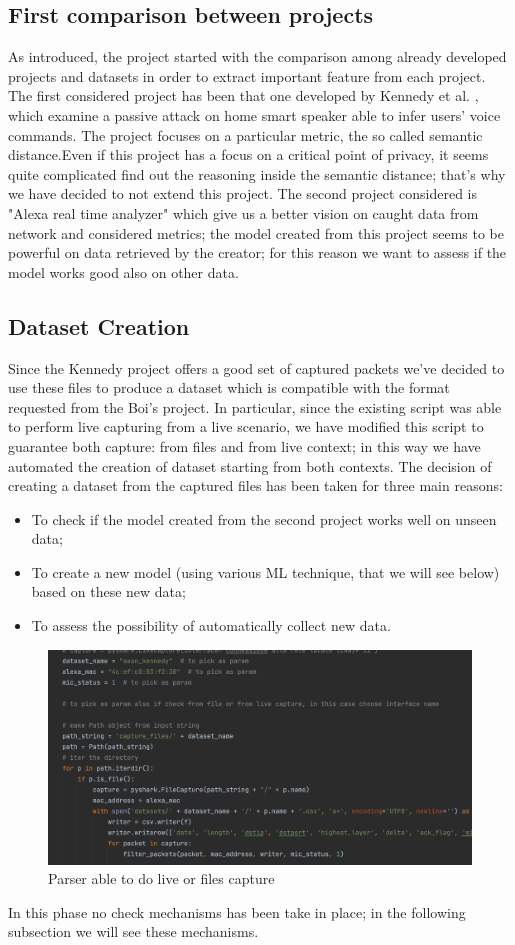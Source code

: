 \documentclass[sigconf]{acmart}
\begin{document}
\subsection{First comparison between projects}
As introduced, the project started with the comparison among already developed projects and datasets in order to extract important feature from each project. The first considered project has been that one developed by Kennedy et al. \cite{Kennedy}, which examine a passive attack on home smart speaker able to infer users' voice commands. The project focuses on a particular metric, the so called semantic distance.Even if this project has a focus on a critical point of privacy, it seems  quite complicated find out the reasoning inside the semantic distance; that's why we have decided to not extend this project. The second project considered is "Alexa real time analyzer" which give us a better vision on caught data from network and considered metrics; the model created from this project seems to be powerful on data retrieved by the creator; for this reason we want to assess if the model works good also on other data.
\subsection{Dataset Creation}
Since the Kennedy project offers a good set of captured packets we've decided to use these files to produce a dataset which is compatible with the format requested from the Boi's project. In particular, since the existing script was able to perform live capturing from a live scenario, we have modified this script to guarantee both capture: from files and from live context; in this way we have automated the creation of dataset starting from both contexts.
The decision of creating a dataset from the captured files has been taken for three main reasons:
\begin{itemize}
\item To check if the model created from the second project works well on unseen data;
\item To create a new model (using various ML technique, that we will see below) based on these new data;
\item To assess the possibility of automatically collect new data.
\end{itemize}
\begin{figure}[h!]
        \includegraphics[width=0.8\linewidth]{img/parser.png}
        \caption{Parser able to do live or files capture}
        \label{fig:parser}
    \end{figure}
In this phase no check mechanisms has been take in place; in the following subsection we will see these mechanisms.
\end{document}
